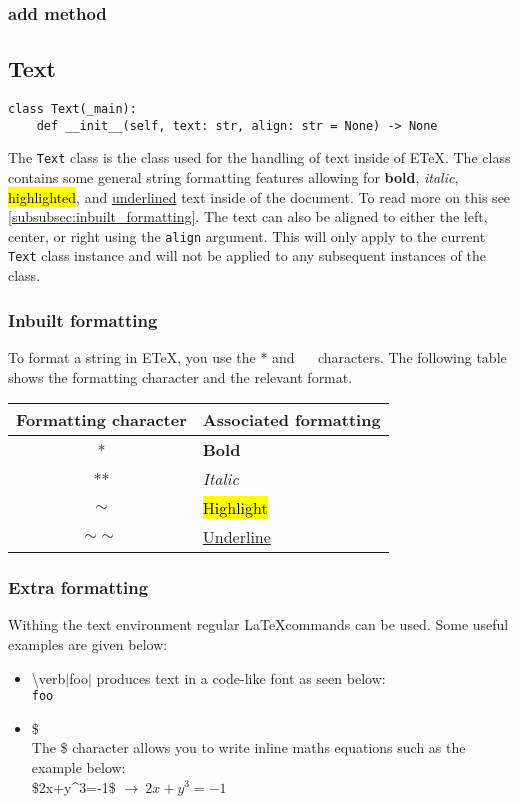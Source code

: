 \documentclass{article}
\begin{document}
\subsubsection{add method}\label{subsubsec:add_method001}

\subsection{Text}\label{subsec:text}
\begin{verbatim}
class Text(_main):
	def __init__(self, text: str, align: str = None) -> None
\end{verbatim}
The \verb|Text| class is the class used for the handling of text inside of ETeX. The class contains some general string formatting features allowing for \textbf{bold}, \textit{italic}, \hl{highlighted}, and \underline{underlined} text inside of the document. To read more on this see \autoref{subsubsec:inbuilt_formatting}. The text can also be aligned to either the left, center, or right using the \verb|align| argument. This will only apply to the current \verb|Text| class instance and will not be applied to any subsequent instances of the class.
\subsubsection{Inbuilt formatting}\label{subsubsec:inbuilt_formatting}
To format a string in ETeX, you use the * and \ ~{} characters. The following table shows the formatting character and the relevant format.\\

\begin{center}
\begin{tabular}{| c | l |}
\hline
Formatting character & Associated formatting \\ \hline
* & \textbf{Bold} \\
** & \textit{Italic} \\
$\sim$ & \hl{Highlight} \\
$\sim\sim$ & \underline{Underline} \\
\hline
\end{tabular}
\end{center}

\subsubsection{Extra formatting}\label{subsubsec:extra_formatting}
Withing the text environment regular \LaTeX  commands can be used. Some useful examples are given below:\begin{itemize}
\item {\textbackslash}verb$\mid${foo}$\mid$ produces text in a code-like font as seen below:\\
\verb|foo|
\item \$\\The \$ character allows you to write inline maths equations such as the example below:\\
\$2x+y\^{}3=-1\$ $\rightarrow\ 2x+y^3=-1$
\end{itemize}
\end{document}
